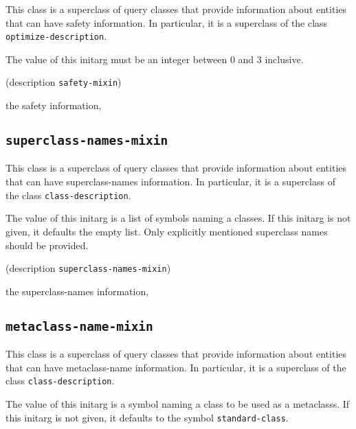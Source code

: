This class is a superclass of query classes that provide information
about entities that can have safety information.  In particular, it is a
superclass of the class \texttt{optimize-description}.

{\footnotesize
{}
}

The value of this initarg must be an integer between $0$ and $3$
inclusive.

{\footnotesize
{} {(description {\tt safety-mixin})}
}

 the safety information, 

\subsection{\texttt{superclass-names-mixin}}
\label{sec-superclass-names-mixin}

{\footnotesize
{}
}

This class is a superclass of query classes that provide information
about entities that can have superclass-names information.  In
particular, it is a superclass of the class \texttt{class-description}.

{\footnotesize
{}
}

The value of this initarg is a list of symbols naming a classes.  If
this initarg is not given, it defaults the empty list.  Only
explicitly mentioned superclass names should be provided.

{\footnotesize
{} {(description {\tt superclass-names-mixin})}
}

 the superclass-names information, 

\subsection{\texttt{metaclass-name-mixin}}
\label{sec-metaclass-name-mixin}

{\footnotesize
{}
}

This class is a superclass of query classes that provide information
about entities that can have metaclass-name information.  In
particular, it is a superclass of the class
\texttt{class-description}.

{\footnotesize
{}
}

The value of this initarg is a symbol naming a class to be used as a
metaclasss.  If this initarg is not given, it defaults to the symbol
\texttt{standard-class}.

